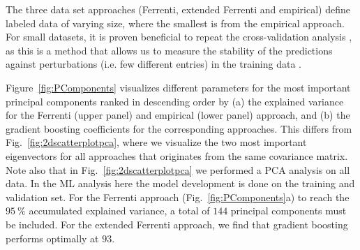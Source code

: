 \documentclass[superscriptaddress,unsortedaddress,
 amsmath,amssymb,
 aps,
]{revtex4-2}
\begin{document}

The three data set approaches (Ferrenti, extended Ferrenti and empirical) define labeled data of varying size, where the smallest is from the empirical approach. For small datasets, it is proven beneficial to repeat the cross-validation analysis \cite{Hastie2009}, as this is a method that allows us to measure the stability of the predictions  against perturbations (i.e. few different entries) in the training data \cite{Beleites2008}.

Figure~\ref{fig:PComponents} visualizes different parameters for the most important principal components ranked in descending order by (a) the explained variance for the Ferrenti (upper panel) and empirical (lower panel) approach, and (b) the gradient boosting coefficients for the corresponding approaches. This differs from Fig.~\ref{fig:2dscatterplotpca}, where we visualize the two most important eigenvectors for all approaches that originates from the same covariance matrix. Note also that in Fig.~\ref{fig:2dscatterplotpca} we performed a PCA analysis on all data. In the ML analysis here the model development is done on the training and validation set. 
For the Ferrenti approach (Fig.~\ref{fig:PComponents}a) to reach the $95 \ \%$ accumulated explained variance, a total of $144$ principal components must be included. For the extended Ferrenti approach, we find that gradient boosting performs optimally at $93$. 
\end{document}
